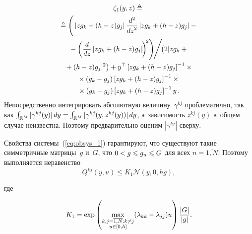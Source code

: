 \begin{multicols}{2}
\noindent
 \begin{multline*} %
 \zeta_1(y,z) \triangleq{}\\
 {}\triangleq
 \left( \vphantom{\left(\fr{d}{dz}\left\vert z 
g_k+(h-z)g_j\right\vert \right)^2}
 \left\vert z g_k+(h-z)g_j\right\vert  \fr{d^2}{dz^2}
 \left\vert z g_k
 +(h-z)g_j\right\vert -{}\right.\\
\left.{}-\left(\fr{d}{dz}\left\vert z 
g_k+(h-z)g_j\right\vert \!\right)^{\!2}
\right)\!\!\Bigg/ \!\!
\left( \vphantom{(h-z)g_j|^2}
2|z g_k+{}\right.\\
\left.{}+(h-z)g_j|^2
\right)
 +y^{\top}\left[z g_k+(h-z)g_j\right]^{-1}\times{}\\
 {}\times \left( g_k-g_j\right)\left[z g_k+(h-z)g_j\right]^{-1}\times{}\\
 {}\times
 \left( g_k-g_j\right)\left[z g_k+(h-z)g_j\right]^{-1}y\,.
 \end{multline*}
 Непосредственно интегрировать абсолютную величину~$\gamma^{kj}$ 
проблематично, так как
 $\int\nolimits_{\mathbb{R}^M}|\gamma^{kj}(y)|\,dy\hm= 
\int\nolimits_{\mathbb{R}^M}|\gamma^{kj}(y, z^{kj}(y))|\,dy$, а~зависимость 
$z^{kj} (y)$ в~общем случае неизвестна. Поэтому предварительно оценим 
$|\gamma^{kj}|$ сверху.

 Свойства системы~(\ref{eq:obsys_1}) гарантируют, что существуют такие 
симметричные матрицы~$g$ и~$G$, что $0\hm < g \hm\leqslant g_n 
\hm\leqslant G$ для всех $n=\overline{1,N}$. Поэтому выполняется 
неравенство
 \begin{equation*}
 Q^{kj}(y,u) \leqslant K_1 \mathcal{N}(y,0,hg),
 \end{equation*}
 
 
 \noindent
  где
  
\vspace*{-3pt}

  \noindent
 $$
 K_1 = \exp\left(
 \max\limits_{\substack{{k,j=\overline{1,N}:k \neq j}\\ {u \in[0,h]}}} 
(\lambda_{kk}-\lambda_{jj})u
 \right)\displaystyle\frac{\displaystyle |G|\mathstrut}{\displaystyle |g|\mathstrut}.
 $$
 

\end{multicols}
